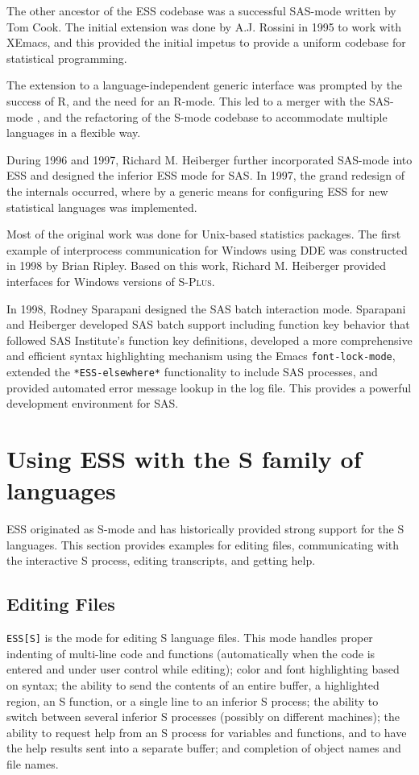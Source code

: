 \documentclass{article}
\newcommand*{\Splus}{\textsc{S-Plus}}
\newcommand{\stexttt}[1]{{\small\texttt{#1}}}
\begin{document}
The other ancestor of the ESS codebase was a successful SAS-mode
written by Tom Cook.  The initial extension was done by A.J. Rossini
in 1995 to work with XEmacs, and this provided the initial impetus to
provide a uniform codebase for statistical programming.

The extension to a language-independent generic interface was prompted
by the success of R, and the need for an R-mode.  This led to a merger
with the SAS-mode \cite{SASMODE}, and the refactoring of the S-mode
codebase to accommodate multiple languages in a flexible way.

During 1996 and 1997, Richard M. Heiberger further incorporated
SAS-mode into ESS and designed the inferior ESS mode for SAS.  In
1997, the grand redesign of the internals occurred, where by a generic
means for configuring ESS for new statistical languages was
implemented. 

Most of the original work was done for Unix-based statistics packages.
The first example of interprocess communication for Windows using DDE
was constructed in 1998 by Brian Ripley.  Based on this work, Richard
M. Heiberger provided interfaces for Windows versions of \Splus.

In 1998, Rodney Sparapani designed the SAS batch interaction mode.
Sparapani and Heiberger developed SAS batch support including function
key behavior that followed SAS Institute's function key definitions,
developed a more comprehensive and efficient syntax highlighting
mechanism using the Emacs \stexttt{font-lock-mode}, extended the
\stexttt{*ESS-elsewhere*} functionality to include SAS processes, and
provided automated error message lookup in the log file.  This
provides a powerful development environment for SAS.


\section{Using ESS with the S family of languages}
\label{sec:S}

ESS originated as S-mode and has historically provided strong support
for the S languages.  This section provides examples for editing
files, communicating with the interactive S process, editing
transcripts, and getting help.

\subsection{Editing Files}
\label{sec:S:edit}

\stexttt{ESS[S]} is the mode for editing S language files.  This mode
handles proper indenting of multi-line code and functions
(automatically when the code is entered and under user control while
editing); color and font highlighting based on syntax; the ability to
send the contents of an entire buffer, a highlighted region, an S
function, or a single line to an inferior S process; the ability to
switch between several inferior S processes (possibly on different
machines); the ability to request help from an S process for variables
and functions, and to have the help results sent into a separate
buffer; and completion of object names and file names.
\end{document}
